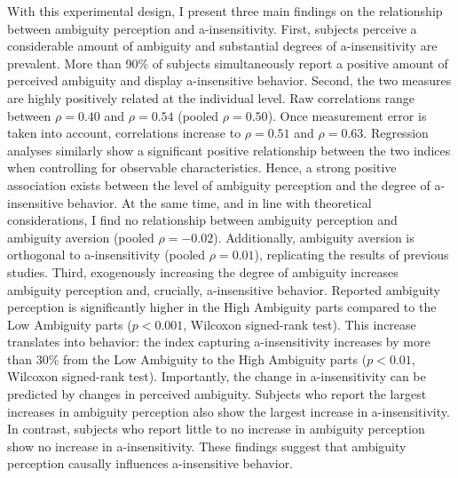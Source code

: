 \documentclass[12pt,a4paper]{article}
\newenvironment{original}
  {\par\medskip\noindent\color{black}\ignorespaces}
  {\par\medskip}
\begin{document}
\begin{original}
With this experimental design, I present three main findings on the relationship between ambiguity perception and a-insensitivity. First, subjects perceive a considerable amount of ambiguity and substantial degrees of a-insensitivity are prevalent. More than 90\% of subjects simultaneously report a positive amount of perceived ambiguity and display a-insensitive behavior. Second, the two measures are highly positively related at the individual level. Raw correlations range between $\rho = 0.40$ and $\rho = 0.54$ (pooled $\rho = 0.50$). Once measurement error is taken into account, correlations increase to $\rho = 0.51$ and $\rho = 0.63$. Regression analyses similarly show a significant positive relationship between the two indices when controlling for observable characteristics. Hence, a strong positive association exists between the level of ambiguity perception and the degree of a-insensitive behavior. At the same time, and in line with theoretical considerations, I find no relationship between ambiguity perception and ambiguity aversion (pooled $\rho = -0.02$). Additionally, ambiguity aversion is orthogonal to a-insensitivity (pooled $\rho = 0.01$), replicating the results of previous studies. Third, exogenously increasing the degree of ambiguity increases ambiguity perception and, crucially, a-insensitive behavior. Reported ambiguity perception is significantly higher in the High Ambiguity parts compared to the Low Ambiguity parts ($p < 0.001$, Wilcoxon signed-rank test). This increase translates into behavior: the index capturing a-insensitivity increases by more than 30\% from the Low Ambiguity to the High Ambiguity parts ($p < 0.01$, Wilcoxon signed-rank test). Importantly, the change in a-insensitivity can be predicted by changes in perceived ambiguity. Subjects who report the largest increases in ambiguity perception also show the largest increase in a-insensitivity. In contrast, subjects who report little to no increase in ambiguity perception show no increase in a-insensitivity. These findings suggest that ambiguity perception causally influences a-insensitive behavior.
\end{original}
\end{document}
